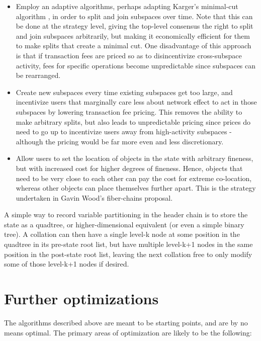 \documentclass[11pt,a4paper]{article}
\theoremstyle{plain}
\theoremstyle{definition}
\theoremstyle{remark}
\begin{document}
\begin{itemize}
\item
Employ an adaptive algorithms, perhaps adapting Karger's minimal-cut algorithm \cite{karger}, in order to split and join subspaces over time. Note that this can be done at the strategy level, giving the top-level consensus the right to split and join subspaces arbitrarily, but making it economically efficient for them to make splits that create a minimal cut. One disadvantage of this approach is that if transaction fees are priced so as to disincentivize cross-subspace activity, fees for specific operations become unpredictable since subspaces can be rearranged.
\item
Create new subspaces every time existing subspaces get too large, and incentivize users that marginally care less about network effect to act in those subspaces by lowering transaction fee pricing. This removes the ability to make arbitrary splits, but also leads to unpredictable pricing since prices do need to go up to incentivize users away from high-activity subspaces - although the pricing would be far more even and less discretionary.
\item
Allow users to set the location of objects in the state with arbitrary fineness, but with increased cost for higher degrees of fineness. Hence, objects that need to be very close to each other can pay the cost for extreme co-location, whereas other objects can place themselves further apart. This is the strategy undertaken in Gavin Wood's fiber-chains proposal\cite{fiberchains}.
\end{itemize}

A simple way to record variable partitioning in the header chain is to store the state as a quadtree\cite{quadtree}, or higher-dimensional equivalent (or even a simple binary tree). A collation can then have a single level-k node at some position in the quadtree in its pre-state root list, but have multiple level-k+1 nodes in the same position in the post-state root list, leaving the next collation free to only modify some of those level-k+1 nodes if desired.

\section{Further optimizations}

The algorithms described above are meant to be starting points, and are by no means optimal. The primary areas of optimization are likely to be the following:
\end{document}
